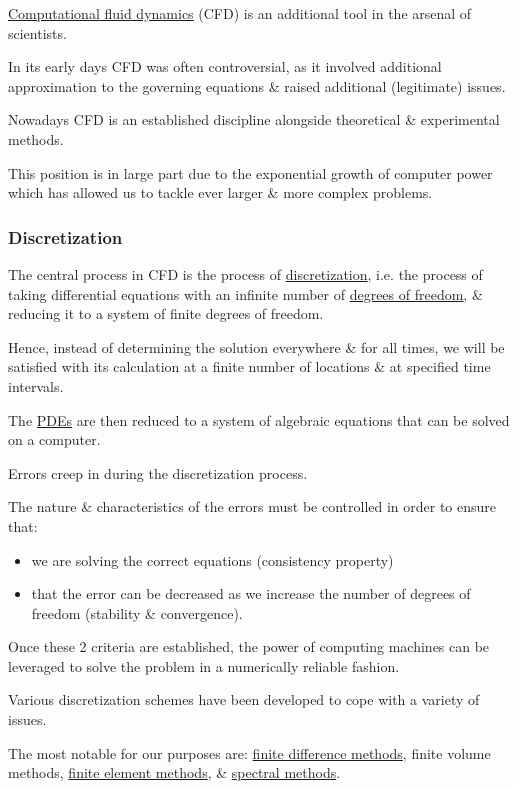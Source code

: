 \documentclass{article}
\begin{document}
\href{https://en.wikipedia.org/wiki/Computational_fluid_dynamics}{Computational fluid dynamics} (CFD) is an additional tool in the arsenal of scientists.

In its early days CFD was often controversial, as it involved additional approximation to the governing equations \& raised additional (legitimate) issues.

Nowadays CFD is an established discipline alongside theoretical \& experimental methods.

This position is in large part due to the exponential growth of computer power which has allowed us to tackle ever larger \& more complex problems.

\subsubsection{Discretization}
The central process in CFD is the process of \href{https://en.wikipedia.org/wiki/Discretization}{discretization}, i.e. the process of taking differential equations with an infinite number of \href{https://en.wikipedia.org/wiki/Degrees_of_freedom}{degrees of freedom}, \& reducing it to a system of finite degrees of freedom.

Hence, instead of determining the solution everywhere \& for all times, we will be satisfied with its calculation at a finite number of locations \& at specified time intervals.

The \href{https://en.wikipedia.org/wiki/Partial_differential_equations}{PDEs} are then reduced to a system of algebraic equations that can be solved on a computer.

Errors creep in during the discretization process.

The nature \& characteristics of the errors must be controlled in order to ensure that:
\begin{itemize}
	\item we are solving the correct equations (consistency property)
	\item that the error can be decreased as we increase the number of degrees of freedom (stability \& convergence).
\end{itemize}
Once these 2 criteria are established, the power of computing machines can be leveraged to solve the problem in a numerically reliable fashion.

Various discretization schemes have been developed to cope with a variety of issues.

The most notable for our purposes are: \href{https://en.wikipedia.org/wiki/Finite_difference_methods}{finite difference methods}, finite volume methods, \href{https://en.wikipedia.org/wiki/Finite_element_methods}{finite element methods}, \& \href{https://en.wikipedia.org/wiki/Spectral_methods}{spectral methods}.
\end{document}
